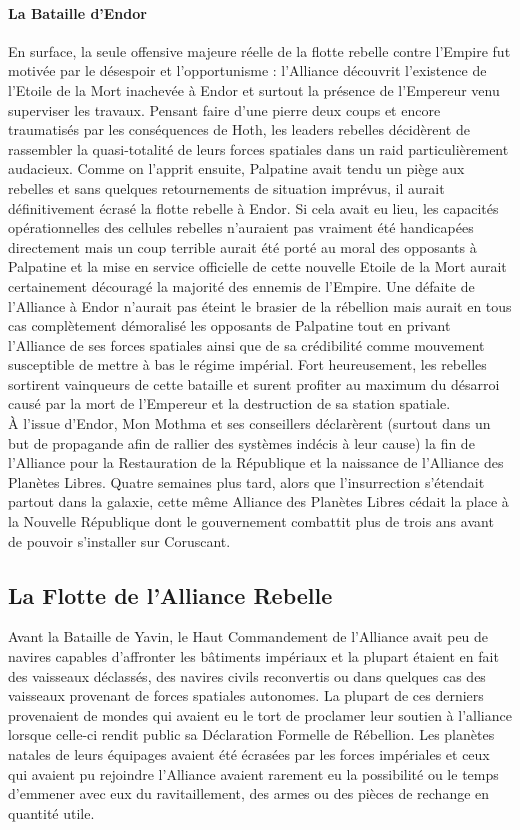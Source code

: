 \documentclass[twoside]{article}
\begin{document}
\paragraph{La Bataille d'Endor}
En surface, la seule offensive majeure réelle de la flotte rebelle contre l'Empire fut motivée par le désespoir et l'opportunisme : l'Alliance découvrit l'existence de l'Etoile de la Mort inachevée à Endor et surtout la présence de l'Empereur venu superviser les travaux. Pensant faire d'une pierre deux coups et encore traumatisés par les conséquences de Hoth, les leaders rebelles décidèrent de rassembler la quasi-totalité de leurs forces spatiales dans un raid particulièrement audacieux.
Comme on l'apprit ensuite, Palpatine avait tendu un piège aux rebelles et sans quelques retournements de situation imprévus, il aurait définitivement écrasé la flotte rebelle à Endor. Si cela avait eu lieu, les capacités opérationnelles des cellules rebelles n'auraient pas vraiment été handicapées directement mais un coup terrible aurait été porté au moral des opposants à Palpatine et la mise en service officielle de cette nouvelle Etoile de la Mort aurait certainement découragé la majorité des ennemis de l'Empire. Une défaite de l'Alliance à Endor n'aurait pas éteint le brasier de la rébellion mais aurait en tous cas complètement démoralisé les opposants de Palpatine tout en privant l'Alliance de ses forces spatiales ainsi que de sa crédibilité comme mouvement susceptible de mettre à bas le régime impérial. Fort heureusement, les rebelles sortirent vainqueurs de cette bataille et surent profiter au maximum du désarroi causé par la mort de l'Empereur et la destruction de sa station spatiale.\\

À l'issue d'Endor, Mon Mothma et ses conseillers déclarèrent (surtout dans un but de propagande afin de rallier des systèmes indécis à leur cause) la fin de l'Alliance pour la Restauration de la République et la naissance de l'Alliance des Planètes Libres. Quatre semaines plus tard, alors que l'insurrection s'étendait partout dans la galaxie, cette même Alliance des Planètes Libres cédait la place à la Nouvelle République dont le gouvernement combattit plus de trois ans avant de pouvoir s'installer sur Coruscant.

\subsection{La Flotte de l'Alliance Rebelle}
Avant la Bataille de Yavin, le Haut Commandement de l'Alliance avait peu de navires capables d'affronter les bâtiments impériaux et la plupart étaient en fait des vaisseaux déclassés, des navires civils reconvertis ou dans quelques cas des vaisseaux provenant de forces spatiales autonomes. La plupart de ces derniers provenaient de mondes qui avaient eu le tort de proclamer leur soutien à l'alliance lorsque celle-ci rendit public sa Déclaration Formelle de Rébellion. Les planètes natales de leurs équipages avaient été écrasées par les forces impériales et ceux qui avaient pu rejoindre l'Alliance avaient rarement eu la possibilité ou le temps d'emmener avec eux du ravitaillement, des armes ou des pièces de rechange en quantité utile.\\
\end{document}
